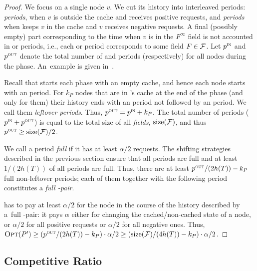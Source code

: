 \begin{proof}
We focus on a single node $v$.  We cut its history into interleaved periods:
\pout \emph{periods}, when $v$ is outside the cache and receives positive 
requests, and \pin \emph{periods} when \ALGTC keeps $v$ in the cache and $v$
receives negative requests. A final (possibly empty) part corresponding to the
time when $v$ is in the $F^\infty$ field is not accounted in \pout or \pin
periods, i.e., each \pin or \pout period corresponds to some field $F \in \mathcal{F}$.
Let $p^\textnormal{\textsc{in}}$ and $p^\textnormal{\textsc{out}}$ denote the total number of \pin and \pout periods
(respectively) for all nodes during the phase. An~example is given
in~.

Recall that \ALGTC starts each phase with an empty cache, and hence each node
starts with an \pout period. For $k_P$ nodes that are in {\ALGTC}'s cache at the
end of the phase (and only for them) their history ends with an \pout period
not followed by an \pin period. We call them \emph{leftover periods}. Thus,
$p^\textnormal{\textsc{out}} = p^\textnormal{\textsc{in}} + k_P$. The total number of periods ($p^\textnormal{\textsc{in}} + p^\textnormal{\textsc{out}}$) is
equal to the total size of all \emph{fields}, $\textrm{size}(\mathcal{F})$, and thus $p^\textnormal{\textsc{out}} 
\geq \textrm{size}(\mathcal{F}) / 2$.

We call a period \emph{full} if it has at least $\alpha/2$ requests. The
shifting strategies described in the previous section ensure that all
\pin periods are full and at least $1/(2 h(T))$ of all \pout periods are full.
Thus, there are at least $p^\textnormal{\textsc{out}}/(2 h(T)) - k_P$ full non-leftover \pout
periods; each of them together with the following \pin period constitutes a
\emph{full \pout-\pin pair}.

\OPT has to pay at least $\alpha/2$ for the node in the course of the history
described by a~full \pout-\pin pair: it pays $\alpha$ either for changing the
cached/non-cached state of a node, or $\alpha/2$ for all positive requests or
$\alpha/2$ for all negative ones. Thus, $\textsc{Opt}(P') \geq ( p^\textnormal{\textsc{out}} / (2 h(T)) -
k_P ) \cdot \alpha/2 \geq ( \textrm{size}(\mathcal{F}) / (4 h(T)) - k_P ) \cdot \alpha/2$.
\end{proof}



\subsection{Competitive Ratio}
\label{sec:comp_ratio}

